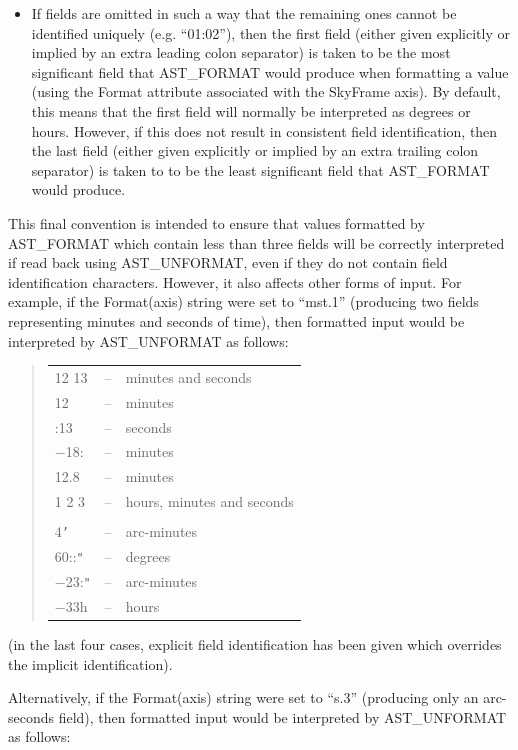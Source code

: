 \documentclass[twoside,11pt]{article}
\newcommand{\htmlref}[2]{#1}
\begin{document}
\begin{itemize}
\item If fields are omitted in such a way that the remaining ones
cannot be identified uniquely (e.g. ``01:02''), then the first field
(either given explicitly or implied by an extra leading colon
separator) is taken to be the most significant field that AST\_FORMAT
would produce when formatting a value (using the Format attribute
associated with the SkyFrame axis). By default, this means that the
first field will normally be interpreted as degrees or hours. However,
if this does not result in consistent field identification, then the
last field (either given explicitly or implied by an extra trailing
colon separator) is taken to to be the least significant field that
AST\_FORMAT would produce.

\end{itemize}

This final convention is intended to ensure that values formatted by
AST\_FORMAT which contain less than three fields will be correctly
interpreted if read back using AST\_UNFORMAT, even if they do not
contain field identification characters.  However, it also affects
other forms of input. For example, if the \htmlref{Format(axis)}{Formataxis} string were set
to ``mst.1'' (producing two fields representing minutes and seconds of
time), then formatted input would be interpreted by AST\_UNFORMAT as
follows:

\begin{quote}
\begin{tabular}{lll}
12 13 & -- & minutes and seconds \\
12 & -- & minutes \\
:13 & -- & seconds \\
$-$18: & -- & minutes \\
12.8 & -- & minutes \\
1 2 3 & -- & hours, minutes and seconds \\
& & \\
4{\tt{'}} & -- & arc-minutes \\
60::{\tt{"}} & -- & degrees \\
$-$23:{\tt{"}} & -- & arc-minutes \\
$-$33h & -- & hours
\end{tabular}
\end{quote}

(in the last four cases, explicit field identification has been given
which overrides the implicit identification).

Alternatively, if the Format(axis) string were set to ``s.3''
(producing only an arc-seconds field), then formatted input would be
interpreted by AST\_UNFORMAT as follows:
\end{document}
